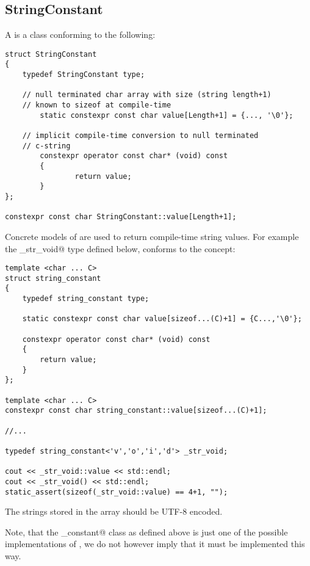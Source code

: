 \subsection{StringConstant}
\label{concept-StringConstant}

A  is a class conforming to the following:

\begin{verbatim}
struct StringConstant
{
	typedef StringConstant type;

	// null terminated char array with size (string length+1)
	// known to sizeof at compile-time
        static constexpr const char value[Length+1] = {..., '\0'};

	// implicit compile-time conversion to null terminated
	// c-string
        constexpr operator const char* (void) const
        {
                return value;
        }
};

constexpr const char StringConstant::value[Length+1];
\end{verbatim}

Concrete models of  are used to return compile-time string values.
For example the \verb@_str_void@ type defined below, conforms to the 
concept:

\begin{verbatim}
template <char ... C>
struct string_constant
{
	typedef string_constant type;

	static constexpr const char value[sizeof...(C)+1] = {C...,'\0'};

	constexpr operator const char* (void) const
	{
		return value;
	}
};

template <char ... C>
constexpr const char string_constant::value[sizeof...(C)+1];

//...

typedef string_constant<'v','o','i','d'> _str_void;

cout << _str_void::value << std::endl;
cout << _str_void() << std::endl;
static_assert(sizeof(_str_void::value) == 4+1, "");
\end{verbatim}

The strings stored in the \verb@value@ array should be UTF-8 encoded.

Note, that the \verb@string_constant@ class as defined above is just one of the
possible implementations of , we do not however imply
that it must be implemented this way.
